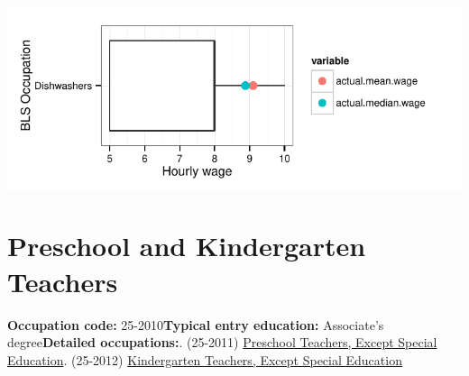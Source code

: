 \documentclass[a4paper,10pt]{article}\usepackage[]{graphicx}\usepackage[]{color}
\makeatletter
\def\maxwidth{ %
  \ifdim\Gin@nat@width>\linewidth
    \linewidth
  \else
    \Gin@nat@width
  \fi
}
\makeatother
\begin{document}
{\centering \includegraphics[width=\maxwidth]{figure/unnamed-chunk-266} 

}


\newpage\section{Preschool and Kindergarten Teachers}\textbf{Occupation code:} 25-2010\newline\textbf{Typical entry education:} Associate's degree\newline\textbf{Detailed occupations:}. (25-2011)  \href{http://www.bls.gov/oes/current/oes252011.htm}{Preschool Teachers, Except Special Education}. (25-2012)  \href{http://www.bls.gov/oes/current/oes252012.htm}{Kindergarten Teachers, Except Special Education}\newline%
\end{document}
